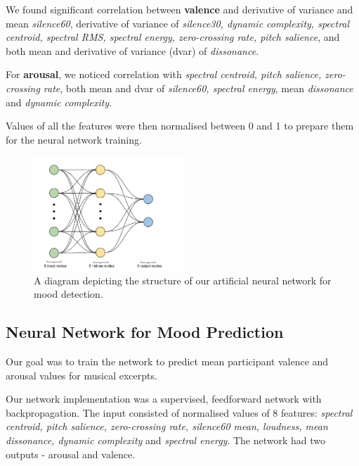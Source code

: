 We found significant correlation between \textbf{valence} and derivative of variance and mean \textit{silence60}, derivative of variance of \textit{silence30, dynamic complexity, spectral centroid, spectral RMS, spectral energy, zero-crossing rate, pitch salience}, and both mean and derivative of variance (dvar) of \textit{dissonance}. 

For \textbf{arousal}, we noticed correlation with \textit{spectral centroid, pitch salience, zero-crossing rate}, both mean and dvar of  \textit{silence60, spectral energy}, mean \textit{dissonance} and \textit{dynamic complexity}. 

Values of all the features were then normalised between 0 and 1 to prepare them for the neural network training. 

\begin{figure}
  \vspace{-30pt}
  \begin{center}
    \includegraphics[width=0.5\textwidth]{Figures/myANN}
  \end{center}
  \caption{A diagram depicting the structure of our artificial neural network for mood detection.}
\label{fig:finalnetwork}
\end{figure}

\vspace{10pt}

\subsection{Neural Network for Mood Prediction}

Our goal was to train the network to predict mean participant valence and arousal values for musical excerpts.
 
Our network implementation was a supervised, feedforward network with backpropagation. 
The input consisted of normalised values of 8 features:
\textit{spectral centroid, pitch salience, zero-crossing rate, silence60 mean, loudness, mean dissonance, dynamic complexity} and \textit{spectral energy}. 
The network had two outputs - arousal and valence.

